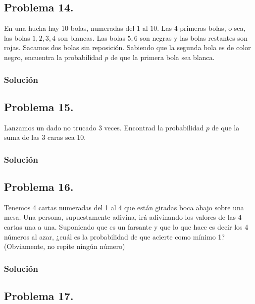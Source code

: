\documentclass[
]{article}
\begin{document}
\hypertarget{problema-14.}{%
\subsection{Problema 14.}\label{problema-14.}}

En una hucha hay \(10\) bolas, numeradas del \(1\) al \(10\). Las \(4\)
primeras bolas, o sea, las bolas \(1,2,3,4\) son blancas. Las bolas
\(5,6\) son negras y las bolas restantes son rojas. Sacamos dos bolas
sin reposición. Sabiendo que la segunda bola es de color negro,
encuentra la probabilidad \(p\) de que la primera bola sea blanca.

\hypertarget{soluciuxf3n-13}{%
\subsubsection{Solución}\label{soluciuxf3n-13}}

\hypertarget{problema-15.}{%
\subsection{Problema 15.}\label{problema-15.}}

Lanzamos un dado no trucado 3 veces. Encontrad la probabilidad \(p\) de
que la suma de las 3 caras sea \(10\).

\hypertarget{soluciuxf3n-14}{%
\subsubsection{Solución}\label{soluciuxf3n-14}}

\hypertarget{problema-16.}{%
\subsection{Problema 16.}\label{problema-16.}}

Tenemos 4 cartas numeradas del 1 al 4 que están giradas boca abajo sobre
una mesa. Una persona, supuestamente adivina, irá adivinando los valores
de las 4 cartas una a una. Suponiendo que es un farsante y que lo que
hace es decir los 4 números al azar, ¿cuál es la probabilidad de que
acierte como mínimo 1? (Obviamente, no repite ningún número)

\hypertarget{soluciuxf3n-15}{%
\subsubsection{Solución}\label{soluciuxf3n-15}}

\hypertarget{problema-17.}{%
\subsection{Problema 17.}\label{problema-17.}}
\end{document}
